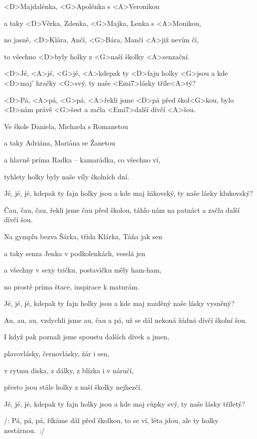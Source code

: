 

\zs
<D>Majdalénka, <G>Apolénka s <A>Veronikou

a taky <D>Věrka, Zdenka, <G>Majka, Lenka s <A>Monikou,

no jasně, <D>Klára, Ančí, <G>Bára, Mančí <A>již nevím čí,

to všechno <D>byly holky z <G>naší školky <A>senzační.
\ks

\zr
<D>Jé, <A>jé, <G>jé,
<A>kdepak ty <D>fajn holky <G>jsou
a kde <D>maj' hračky <G>svý,
ty naše <Emi7>lásky tříle<A>tý?

<D>Pá, <A>pá, <G>pá,
<A>řekli jsme <D>pá před škol<G>kou,
bylo <D>nám právě <G>šest
a začla <Emi7>další dívčí <A>šou.
\kr

\zs
Ve škole Daniela, Michaela s Romanetou

a taky Adriána, Mariána se Žanetou

a hlavně príma Radka -- kamarádka, co všechno ví,

tyhlety holky byly naše víly školních dní.
\ks

\zr
Jé, jé, jé, kdepak ty fajn holky jsou
a kde maj žákovský, ty naše lásky klukovský?

Čau, čau, čau, řekli jsme čau před školou,
táhlo nám na patnáct a začla další dívčí šou.
\kr

\zs
Na gymplu bezva Šárka, třída Klárka, Táňa jak sen

a taky senza Jenka v podkolenkách, veselá jen

a všechny v sexy tričku, postavičku měly ham-ham,

no prostě príma štace, inspirace k maturám.
\ks

\zr
Jé, jé, jé,
kdepak ty fajn holky jsou
a kde maj zazděný
naše lásky vysněný?

Au, au, au,
vzdychli jsme au, čau a pá,
už se dál nekoná
žádná dívčí školní šou.
\kr

\zs
I když pak poznali jsme spoustu dalších dívek a jmen,

plavovlásky, černovlásky, žár i sen,

v rytmu diska, z dálky, z blízka i v náručí,

přesto jsou stále holky z naší školky nejhezčí.
\ks

\zr
Jé, jé, jé,
kdepak ty fajn holky jsou
a kde maj cůpky svý,
ty naše lásky tříletý?

/: Pá, pá, pá,
říkáme dál před školkou,
to se ví, léta jdou,
ale ty holky nestárnou.~:/
\kr

\kp
